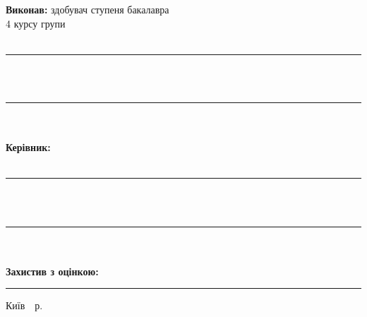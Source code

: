     \begin{flushright}
        \begin{minipage}{0.5\textwidth}
            \textbf{Виконав:} здобувач ступеня бакалавра \\
            4 курсу групи \underline{\reportAuthorGroup} \\

            \reportAuthor \\
            \rule{7.5cm}{0.15mm} \\
             \\

            \rule{7.5cm}{0.15mm} \\
             \\

            \vspace{0.8cm}
            \textbf{Керівник:} \\
            \supervisorPib \\
            \rule{7.5cm}{0.15mm} \\
             \\

            \rule{7.5cm}{0.15mm} \\
             \\

            \vspace{0.8cm}
            \textbf{Захистив з оцінкою:} \\

            \rule{7.5cm}{0.15mm}
        \end{minipage}
    \end{flushright}
    \vfill
    \begin{center}
        {Київ~\YearOfDefence~р.}
    \end{center}

    \newpage
\thispagestyle{plain}